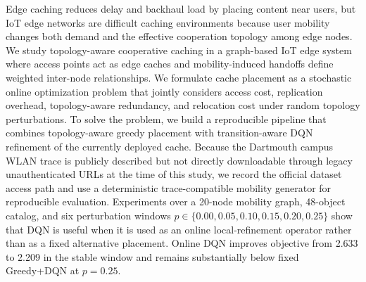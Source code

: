 Edge caching reduces delay and backhaul load by placing content near users, but IoT edge networks are difficult caching environments because user mobility changes both demand and the effective cooperation topology among edge nodes. We study topology-aware cooperative caching in a graph-based IoT edge system where access points act as edge caches and mobility-induced handoffs define weighted inter-node relationships. We formulate cache placement as a stochastic online optimization problem that jointly considers access cost, replication overhead, topology-aware redundancy, and relocation cost under random topology perturbations. To solve the problem, we build a reproducible pipeline that combines topology-aware greedy placement with transition-aware DQN refinement of the currently deployed cache. Because the Dartmouth campus WLAN trace is publicly described but not directly downloadable through legacy unauthenticated URLs at the time of this study, we record the official dataset access path and use a deterministic trace-compatible mobility generator for reproducible evaluation. Experiments over a 20-node mobility graph, 48-object catalog, and six perturbation windows \(p\in\{0.00,0.05,0.10,0.15,0.20,0.25\}\) show that DQN is useful when it is used as an online local-refinement operator rather than as a fixed alternative placement. Online DQN improves objective from 2.633 to 2.209 in the stable window and remains substantially below fixed Greedy+DQN at \(p=0.25\).

